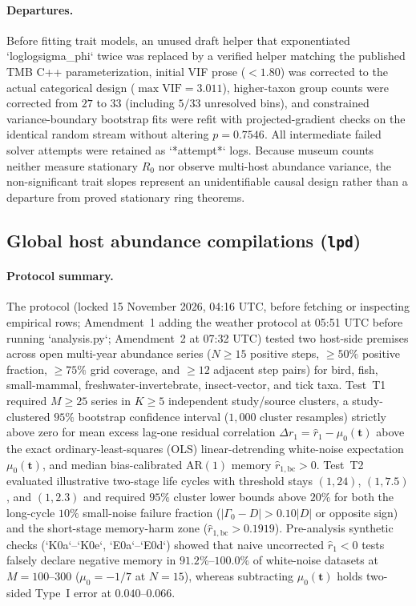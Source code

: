 \paragraph{Departures.}
Before fitting trait models, an unused draft helper that exponentiated `loglogsigma\_phi` twice was replaced by a verified helper matching the published TMB C++ parameterization, initial VIF prose ($< 1.80$) was corrected to the actual categorical design ($\max\mathrm{VIF} = 3.011$), higher-taxon group counts were corrected from $27$ to $33$ (including $5/33$ unresolved bins), and constrained variance-boundary bootstrap fits were refit with projected-gradient checks on the identical random stream without altering $p = 0.7546$. All intermediate failed solver attempts were retained as `*attempt*` logs. Because museum counts neither measure stationary $R_0$ nor observe multi-host abundance variance, the non-significant trait slopes represent an unidentifiable causal design rather than a departure from proved stationary ring theorems.

\subsection{Global host abundance compilations (\texttt{lpd})}\label{num-esm-lpd}

\paragraph{Protocol summary.}
The protocol (locked 15 November 2026, 04:16 UTC, before fetching or inspecting empirical rows; Amendment~1 adding the weather protocol at 05:51 UTC before running `analysis.py`; Amendment~2 at 07:32 UTC) tested two host-side premises across open multi-year abundance series ($N \ge 15$ positive steps, $\ge 50\%$ positive fraction, $\ge 75\%$ grid coverage, and $\ge 12$ adjacent step pairs) for bird, fish, small-mammal, freshwater-invertebrate, insect-vector, and tick taxa. Test~T1 required $M \ge 25$ series in $K \ge 5$ independent study/source clusters, a study-clustered $95\%$ bootstrap confidence interval ($1{,}000$ cluster resamples) strictly above zero for mean excess lag-one residual correlation $\Delta r_1 = \hat{r}_1 - \mu_0(\mathbf{t})$ above the exact ordinary-least-squares (OLS) linear-detrending white-noise expectation $\mu_0(\mathbf{t})$, and median bias-calibrated $\mathrm{AR}(1)$ memory $\hat{r}_{1,\mathrm{bc}} > 0$. Test~T2 evaluated illustrative two-stage life cycles with threshold stays $(1, 24)$, $(1, 7.5)$, and $(1, 2.3)$ and required $95\%$ cluster lower bounds above $20\%$ for both the long-cycle $10\%$ small-noise failure fraction ($|\Gamma_0 - D| > 0.10|D|$ or opposite sign) and the short-stage memory-harm zone ($\hat{r}_{1,\mathrm{bc}} > 0.1919$). Pre-analysis synthetic checks (`K0a`--`K0e`, `E0a`--`E0d`) showed that naive uncorrected $\hat{r}_1 < 0$ tests falsely declare negative memory in $91.2\%$--$100.0\%$ of white-noise datasets at $M = 100$--$300$ ($\mu_0 = -1/7$ at $N = 15$), whereas subtracting $\mu_0(\mathbf{t})$ holds two-sided Type~I error at $0.040$--$0.066$.

